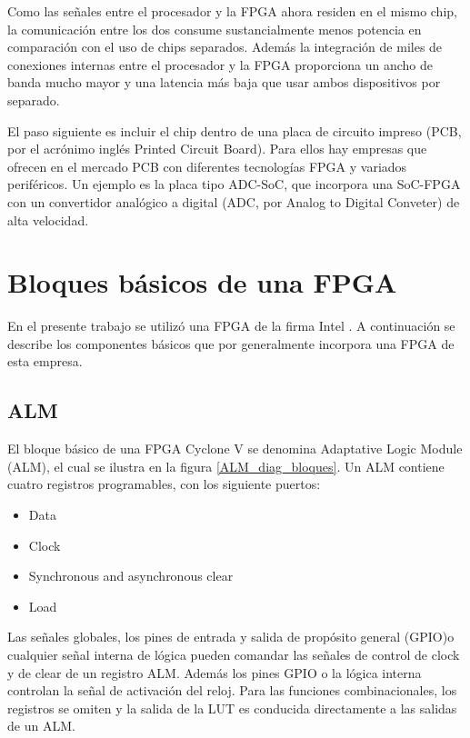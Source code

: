Como las señales entre el procesador y la FPGA ahora residen en el mismo chip, la comunicación entre los dos consume sustancialmente menos potencia en comparación con el uso de chips separados. Además la integración de miles de conexiones internas entre el procesador y la FPGA proporciona un ancho de banda mucho mayor y una latencia más baja que usar ambos dispositivos por separado.

El paso siguiente es incluir el chip dentro de una placa de circuito impreso (PCB, por el acrónimo inglés Printed Circuit Board). Para ellos hay empresas que ofrecen en el mercado PCB con diferentes tecnologías FPGA y variados periféricos. Un ejemplo es la placa tipo ADC-SoC, que incorpora una SoC-FPGA con un convertidor analógico a digital (ADC, por Analog to Digital Conveter) de alta velocidad.


\section{Bloques básicos de una FPGA}
En el presente trabajo se utilizó una FPGA de la firma Intel \citep{cycloneV_handbook}. A continuación se describe los componentes básicos que por generalmente incorpora una FPGA de esta empresa.

\subsection{ALM}

El bloque básico de una FPGA Cyclone V se denomina Adaptative Logic Module (ALM), el cual se ilustra en la figura \ref{ALM_diag_bloques}. Un ALM contiene cuatro registros programables, con los siguiente puertos:
\begin{itemize}
\item Data
\item Clock
\item Synchronous and asynchronous clear
\item Load
\end{itemize}

Las señales globales, los pines de entrada y salida de propósito general (GPIO)o cualquier señal interna de lógica pueden comandar las señales de control de clock y de clear de un registro ALM. Además los pines GPIO o la lógica interna controlan la señal de activación del reloj. Para las funciones combinacionales, los registros se omiten y la salida de la LUT es conducida directamente a las salidas de un ALM.

